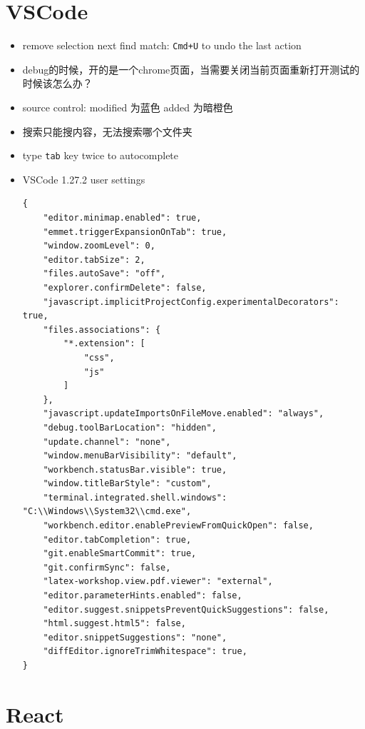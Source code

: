 \documentclass[a4paper, 12pt]{article}
\begin{document}
\section{VSCode}
\begin{itemize}

\item remove selection next find match: \verb|Cmd+U| to undo the last action

\item debug的时候，开的是一个chrome页面，当需要关闭当前页面重新打开测试的时候该怎么办？

\item source control: modified 为蓝色 \quad added 为暗橙色

\item 搜索只能搜内容，无法搜索哪个文件夹

\item type \verb|tab| key twice to autocomplete

\item VSCode 1.27.2 user settings
\begin{verbatim}
{
    "editor.minimap.enabled": true,
    "emmet.triggerExpansionOnTab": true,
    "window.zoomLevel": 0,
    "editor.tabSize": 2,
    "files.autoSave": "off",
    "explorer.confirmDelete": false,
    "javascript.implicitProjectConfig.experimentalDecorators": true,
    "files.associations": {
        "*.extension": [
            "css",
            "js"
        ]
    },
    "javascript.updateImportsOnFileMove.enabled": "always",
    "debug.toolBarLocation": "hidden",
    "update.channel": "none",
    "window.menuBarVisibility": "default",
    "workbench.statusBar.visible": true,
    "window.titleBarStyle": "custom",
    "terminal.integrated.shell.windows": "C:\\Windows\\System32\\cmd.exe",
    "workbench.editor.enablePreviewFromQuickOpen": false,
    "editor.tabCompletion": true,
    "git.enableSmartCommit": true,
    "git.confirmSync": false,
    "latex-workshop.view.pdf.viewer": "external",
    "editor.parameterHints.enabled": false,
    "editor.suggest.snippetsPreventQuickSuggestions": false,
    "html.suggest.html5": false,
    "editor.snippetSuggestions": "none",
    "diffEditor.ignoreTrimWhitespace": true,
}
\end{verbatim}
\end{itemize}


\section{React}
\end{document}
